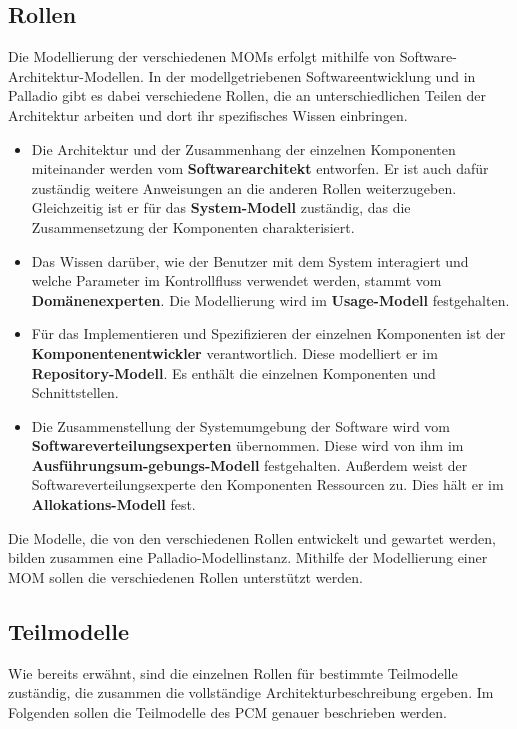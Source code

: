 \subsection{Rollen}
Die Modellierung der verschiedenen MOMs erfolgt mithilfe von Software-Architektur-Modellen. In der modellgetriebenen Softwareentwicklung und in Palladio gibt es dabei verschiedene Rollen, die an unterschiedlichen Teilen der Architektur arbeiten und dort ihr spezifisches Wissen einbringen.
\begin{itemize}
\item Die Architektur und der Zusammenhang der einzelnen Komponenten
miteinander werden vom \textbf{Softwarearchitekt} entworfen. Er ist auch dafür
zuständig weitere Anweisungen an die anderen Rollen weiterzugeben. Gleichzeitig ist er für das \textbf{System-Modell} zuständig, das die Zusammensetzung der Komponenten charakterisiert.
\item Das Wissen darüber, wie der Benutzer mit dem System interagiert
und welche Parameter im Kontrollfluss verwendet werden, stammt vom \textbf{Domänenexperten}. Die Modellierung wird im \textbf{Usage-Modell} festgehalten.
\item Für das Implementieren und Spezifizieren der einzelnen
Komponenten ist der \textbf{Komponentenentwickler} verantwortlich. Diese modelliert er im \textbf{Repository-Modell}. Es enthält die einzelnen Komponenten und Schnittstellen.
\item Die Zusammenstellung der Systemumgebung der Software wird vom \textbf{Softwareverteilungsexperten} übernommen. Diese wird von ihm im \textbf{Ausführungsum-gebungs-Modell} festgehalten. Außerdem weist der Softwareverteilungsexperte den Komponenten Ressourcen zu. Dies hält er im \textbf{Allokations-Modell} fest.
\end{itemize}
Die Modelle, die von den verschiedenen Rollen entwickelt und gewartet werden, bilden zusammen eine Palladio-Modellinstanz. Mithilfe der Modellierung einer MOM sollen die verschiedenen Rollen unterstützt werden. 

\subsection{Teilmodelle}
Wie bereits erwähnt, sind die einzelnen Rollen für bestimmte Teilmodelle zuständig, die zusammen die vollständige Architekturbeschreibung ergeben. Im Folgenden sollen die Teilmodelle des PCM genauer beschrieben werden.
